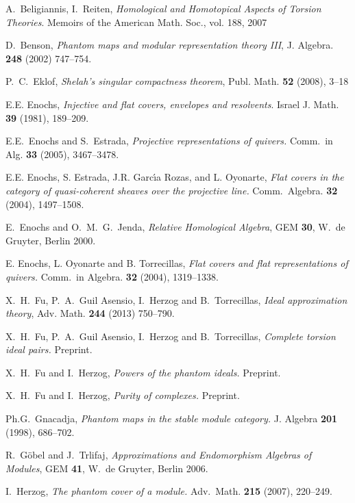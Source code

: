 \documentclass[11pt]{amsart}
\begin{document}
{\begin{thebibliography}{99}
 {\sc A.\ Beligiannis, I.\ Reiten}, {\sl Homological and Homotopical Aspects of Torsion Theories}. Memoirs of the American
Math. Soc., vol. 188, 2007

{\sc D.\ Benson}, 
{\sl Phantom maps and modular representation theory III},
J. Algebra. {\bf 248} (2002) 747--754.

{\sc P.\ C.\ Eklof}, {\sl Shelah's singular compactness theorem}, Publ. Math. {\bf 52} (2008), 3--18

{\sc E.E. Enochs}, {\sl Injective and flat covers, envelopes and resolvents}. Israel J. Math.
{\bf 39} (1981), 189--209.

 {\sc E.E.\ Enochs and S.\ Estrada}, {\sl
Projective representations of quivers.} Comm.\ in Alg.
{\bf 33} (2005),  3467--3478.

{\sc E.E. Enochs, S. Estrada, J.R. Garc\'{\i}a Rozas, and L. Oyonarte}, {\sl
Flat covers in the category of quasi-coherent sheaves over the
projective line.} Comm.\ Algebra. {\bf 32} (2004), 1497--1508.

{\sc E.\ Enochs and O.\ M.\ G.\ Jenda}, {\sl Relative Homological Algebra}, GEM
{\bf 30}, W.\ de Gruyter, Berlin 2000.

{\sc E. Enochs, L. Oyonarte and B. Torrecillas}, {\sl Flat covers and
flat representations of quivers.} Comm.\ in
Algebra. {\bf 32} (2004), 1319--1338.

{\sc X.\ H.\ Fu, P.\ A.\ Guil Asensio, I.\ Herzog and B.\ Torrecillas}, {\sl Ideal approximation theory}, Adv. Math. {\bf 244} (2013) 750--790.

{\sc X.\ H.\ Fu, P.\ A.\ Guil Asensio, I.\ Herzog and B.\ Torrecillas}, {\sl Complete torsion ideal pairs.} Preprint.

{\sc X.\ H.\ Fu and I.\ Herzog}, {\sl Powers of the phantom ideals.} Preprint.

{\sc X.\ H.\ Fu and I.\ Herzog}, {\sl Purity of complexes.} Preprint.

{\sc Ph.G.\ Gnacadja}, {\sl Phantom maps in the stable module category.} J. Algebra {\bf 201} (1998), 686--702.

 {\sc R.\ G\" obel and J.\ Trlifaj},
{\sl Approximations and Endomorphism Algebras of Modules}, GEM {\bf
41}, W.\ de Gruyter, Berlin 2006.

{\sc I.\ Herzog}, {\sl The phantom cover of a module.} Adv.\ Math. {\bf 215} (2007), 220--249.


\end{thebibliography}}
\end{document}
